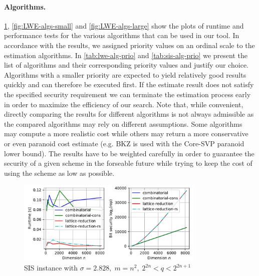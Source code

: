 \paragraph{Algorithms.} \label{sec:tool-algorithms} \cref{fig:SIS-algs}, \ref{fig:LWE-algs-small} and \ref{fig:LWE-algs-large} show the plots of runtime and performance tests for the various algorithms that can be used in our tool. In accordance with the results, we assigned priority values on an ordinal scale to the estimation algorithms. In \cref{tab:lwe-alg-prio} and \ref{tab:sis-alg-prio} we present the list of algorithms and their corresponding priority values and justify our choice. Algorithms with a smaller priority are expected to yield relatively good results quickly and can therefore be executed first. If the estimate result does not satisfy the specified security requirement we can terminate the estimation process early in order to maximize the efficiency of our search. Note that, while convenient, directly comparing the results for different algorithms is not always admissible as the compared algorithms may rely on different assumptions. Some algorithms may compute a more realistic cost while others may return a more conservative or even paranoid cost estimate (e.g. BKZ is used with the Core-SVP paranoid lower bound). The results have to be weighted carefully in order to guarantee the security of a given scheme in the forseable future while trying to keep the cost of using the scheme as low as possible. %
\begin{figure}[h!]
    \centering
    \includegraphics[width=0.8\textwidth]{graphics/SIS_stddev=2,828_plots_1s.pdf}
    \caption{SIS instance with $\sigma=2.828,\; m=n^2, \; 2^{2n} < q < 2^{2n+1}$}\label{fig:SIS-algs}
\end{figure}

